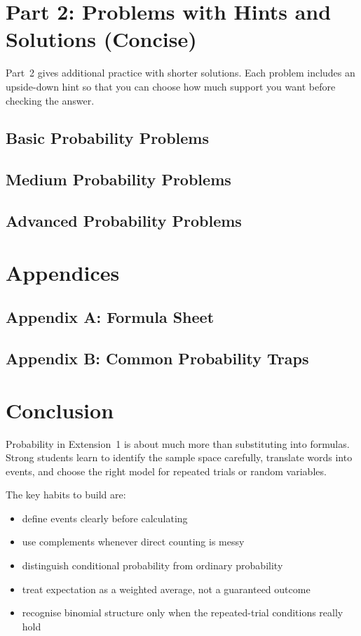 \documentclass[12pt]{article}
\begin{document}
\newpage
\section{Part 2: Problems with Hints and Solutions (Concise)}
Part~2 gives additional practice with shorter solutions. Each problem includes an upside-down hint so that you can choose how much support you want before checking the answer.

\subsection{Basic Probability Problems}


\subsection{Medium Probability Problems}


\subsection{Advanced Probability Problems}


\newpage
\section{Appendices}

\subsection{Appendix A: Formula Sheet}


\subsection{Appendix B: Common Probability Traps}


\newpage
\section{Conclusion}
Probability in Extension~1 is about much more than substituting into formulas. Strong students learn to identify the sample space carefully, translate words into events, and choose the right model for repeated trials or random variables.

The key habits to build are:
\begin{itemize}[leftmargin=*]
  \item define events clearly before calculating
  \item use complements whenever direct counting is messy
  \item distinguish conditional probability from ordinary probability
  \item treat expectation as a weighted average, not a guaranteed outcome
  \item recognise binomial structure only when the repeated-trial conditions really hold
\end{itemize}
\end{document}
